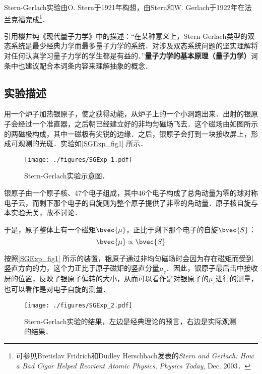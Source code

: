 

Stern-Gerlach实验由O. Stern于1921年构想，由Stern和W. Gerlach于1922年在法兰克福完成\footnote{可参见Bretislav Fridrich和Dudley Herschbach发表的\textsl{Stern and Gerlach: How a Bad Cigar Helped Reorient Atomic Physics}, \textsl{Physics Today}, Dec. 2003．}．

引用樱井纯《现代量子力学》中的描述：“在某种意义上，Stern-Gerlach类型的双态系统是最少经典力学而最多量子力学的系统．对涉及双态系统问题的坚实理解将对任何认真学习量子力学的学生都是有益的．”\textbf{量子力学的基本原理（量子力学）}词条中也建议配合本词条内容来理解抽象的概念．


\subsection{实验描述}

用一个炉子加热银原子，使之获得动能，从炉子上的一个小洞跑出来．出射的银原子会经过一个准直器，之后朝已经建立好的非均匀磁场飞去．这个磁场由如图所示的两磁极构成，其中一磁极有尖锐的边缘．之后，银原子会打到一块接收屏上，形成可观测的光斑．实验如\autoref{SGExp_fig1} 所示．


\begin{figure}[ht]
\centering
\texttt{[image: ./figures/SGExp\_1.pdf]}
\caption{Stern-Gerlach实验示意图．} \label{SGExp_fig1}
\end{figure}

银原子由一个原子核、47个电子组成，其中46个电子构成了总角动量为零的球对称电子云，而剩下那个电子的自旋则为整个原子提供了非零的角动量．原子核自旋与本实验无关，故不讨论．

于是，原子整体上有一个磁矩$\bvec{\mu}$，正比于剩下那个电子的自旋$\bvec{S}$：
\begin{equation}
\bvec{\mu}\propto\bvec{S}
\end{equation}

按照\autoref{SGExp_fig1} 所示的装置，银原子通过非均匀磁场时会因为存在磁矩而受到竖直方向的力，这个力正比于原子磁矩的竖直分量$\mu_z$．因此，银原子最后击中接收屏的位置，反映了银原子偏转的大小，从而可以看作是对银原子的$\mu_z$进行的测量，也可以看作是对电子自旋的测量．




\begin{figure}[ht]
\centering
\texttt{[image: ./figures/SGExp\_2.pdf]}
\caption{Stern-Gerlach实验的结果，左边是经典理论的预言，右边是实际观测的结果．} \label{SGExp_fig2}
\end{figure}


